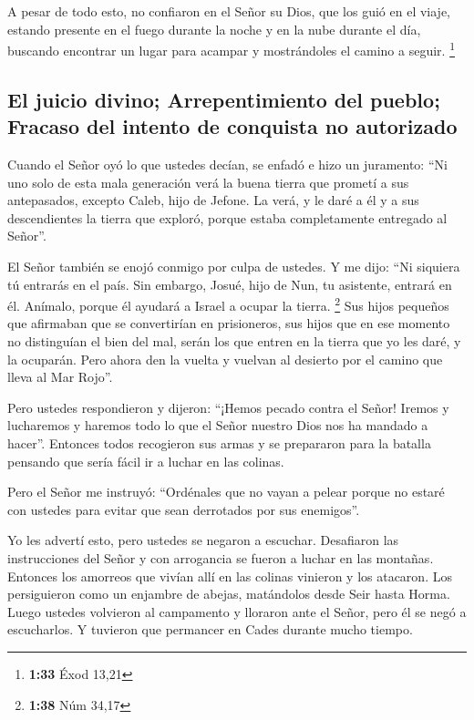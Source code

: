  A pesar de todo esto, no confiaron en el Señor su Dios,
 que los guió en el viaje, estando presente en el fuego
durante la noche y en la nube durante el día, buscando encontrar un
lugar para acampar y mostrándoles el camino a seguir. \footnote{\textbf{1:33}
  Éxod 13,21}

\hypertarget{el-juicio-divino-arrepentimiento-del-pueblo-fracaso-del-intento-de-conquista-no-autorizado}{%
\subsection{El juicio divino; Arrepentimiento del pueblo; Fracaso del
intento de conquista no
autorizado}\label{el-juicio-divino-arrepentimiento-del-pueblo-fracaso-del-intento-de-conquista-no-autorizado}}

 Cuando el Señor oyó lo que ustedes decían, se enfadó e
hizo un juramento:  ``Ni uno solo de esta mala generación
verá la buena tierra que prometí a sus antepasados, 
excepto Caleb, hijo de Jefone. La verá, y le daré a él y a sus
descendientes la tierra que exploró, porque estaba completamente
entregado al Señor''.

 El Señor también se enojó conmigo por culpa de ustedes.
Y me dijo: ``Ni siquiera tú entrarás en el país.  Sin
embargo, Josué, hijo de Nun, tu asistente, entrará en él. Anímalo,
porque él ayudará a Israel a ocupar la tierra. \footnote{\textbf{1:38}
  Núm 34,17}  Sus hijos pequeños que afirmaban que se
convertirían en prisioneros, sus hijos que en ese momento no distinguían
el bien del mal, serán los que entren en la tierra que yo les daré, y la
ocuparán.  Pero ahora den la vuelta y vuelvan al desierto
por el camino que lleva al Mar Rojo''.

 Pero ustedes respondieron y dijeron: ``¡Hemos pecado
contra el Señor! Iremos y lucharemos y haremos todo lo que el Señor
nuestro Dios nos ha mandado a hacer''. Entonces todos recogieron sus
armas y se prepararon para la batalla pensando que sería fácil ir a
luchar en las colinas.

 Pero el Señor me instruyó: ``Ordénales que no vayan a
pelear porque no estaré con ustedes para evitar que sean derrotados por
sus enemigos''.

 Yo les advertí esto, pero ustedes se negaron a escuchar.
Desafiaron las instrucciones del Señor y con arrogancia se fueron a
luchar en las montañas.  Entonces los amorreos que vivían
allí en las colinas vinieron y los atacaron. Los persiguieron como un
enjambre de abejas, matándolos desde Seir hasta Horma. 
Luego ustedes volvieron al campamento y lloraron ante el Señor, pero él
se negó a escucharlos.  Y tuvieron que permancer en Cades
durante mucho tiempo.

